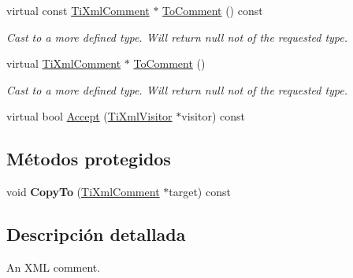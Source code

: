 \begin{DoxyCompactItemize}
\item 
\hypertarget{classTiXmlComment_a00fb4215c20a2399ea05ac9b9e7e68a0}{virtual const \hyperlink{classTiXmlComment}{\-Ti\-Xml\-Comment} $\ast$ \hyperlink{classTiXmlComment_a00fb4215c20a2399ea05ac9b9e7e68a0}{\-To\-Comment} () const }\label{classTiXmlComment_a00fb4215c20a2399ea05ac9b9e7e68a0}

\begin{DoxyCompactList}\small\item\em \-Cast to a more defined type. \-Will return null not of the requested type. \end{DoxyCompactList}\item 
\hypertarget{classTiXmlComment_acc7c7e07e13c23f17797d642981511df}{virtual \hyperlink{classTiXmlComment}{\-Ti\-Xml\-Comment} $\ast$ \hyperlink{classTiXmlComment_acc7c7e07e13c23f17797d642981511df}{\-To\-Comment} ()}\label{classTiXmlComment_acc7c7e07e13c23f17797d642981511df}

\begin{DoxyCompactList}\small\item\em \-Cast to a more defined type. \-Will return null not of the requested type. \end{DoxyCompactList}\item 
virtual bool \hyperlink{classTiXmlComment_a4382de0e50da973f11a23ea5852568bd}{\-Accept} (\hyperlink{classTiXmlVisitor}{\-Ti\-Xml\-Visitor} $\ast$visitor) const 
\end{DoxyCompactItemize}
\subsection*{\-Métodos protegidos}
\begin{DoxyCompactItemize}
\item 
\hypertarget{classTiXmlComment_a3175b2f27628f4fb7a043897930cd934}{void {\bfseries \-Copy\-To} (\hyperlink{classTiXmlComment}{\-Ti\-Xml\-Comment} $\ast$target) const }\label{classTiXmlComment_a3175b2f27628f4fb7a043897930cd934}

\end{DoxyCompactItemize}


\subsection{\-Descripción detallada}
\-An \-X\-M\-L comment. 

